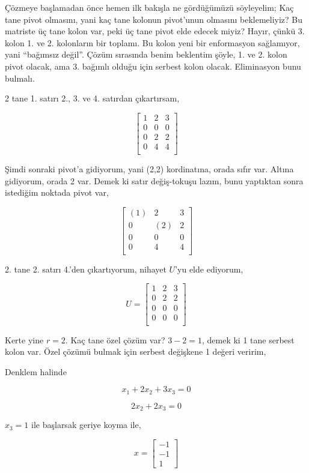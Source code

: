 \documentclass[12pt,fleqn]{article}\usepackage{../../common}
\begin{document}
Çözmeye başlamadan önce hemen ilk bakışla ne gördüğümüzü söyleyelim; Kaç
tane pivot olmasını, yani kaç tane kolonun pivot'unun olmasını
beklemeliyiz? Bu matriste üç tane kolon var, peki üç tane pivot elde edecek
miyiz? Hayır, çünkü 3. kolon 1. ve 2. kolonların bir toplamı. Bu kolon yeni
bir enformasyon sağlamıyor, yani ``bağımsız değil''. Çözüm sırasında benim
beklentim şöyle, 1. ve 2. kolon pivot olacak, ama 3. bağımlı olduğu için
serbest kolon olacak. Eliminasyon bunu bulmalı. 

2 tane 1. satırı 2., 3. ve 4. satırdan çıkartırsam, 

$$ 
\left[\begin{array}{rrr}
1 & 2 & 3 \\
0 & 0 & 0 \\
0 & 2 & 2 \\
0 & 4 & 4 \\
\end{array}\right]
 $$

Şimdi sonraki pivot'a gidiyorum, yani (2,2) kordinatına, orada sıfır
var. Altına gidiyorum, orada 2 var. Demek ki satır değiş-tokuşu lazım, bunu
yaptıktan sonra istediğim noktada pivot var,

$$ 
\left[\begin{array}{ccc}
(1) & 2 & 3 \\
0 & (2) & 2 \\
0 & 0 & 0 \\
0 & 4 & 4 \\
\end{array}\right]
 $$

2. tane 2. satırı 4.'den çıkartıyorum, nihayet $U$'yu elde ediyorum,

$$ 
U = \left[\begin{array}{rrr}
1 & 2 & 3 \\
0 & 2 & 2 \\
0 & 0 & 0 \\
0 & 0 & 0 \\
\end{array}\right]
 $$

Kerte yine $r=2$. Kaç tane özel çözüm var? $3-2=1$, demek ki 1 tane serbest
kolon var. Özel çözümü bulmak için serbest değişkene 1 değeri veririm, 

Denklem halinde

$$ x_1 + 2x_2 + 3x_3 = 0 $$

$$ 2x_2 + 2x_3 = 0 $$

$x_3=1$ ile başlarsak geriye koyma ile,

$$ x = 
\left[\begin{array}{r}
-1\\
-1\\
1
\end{array}\right]
 $$
\end{document}
